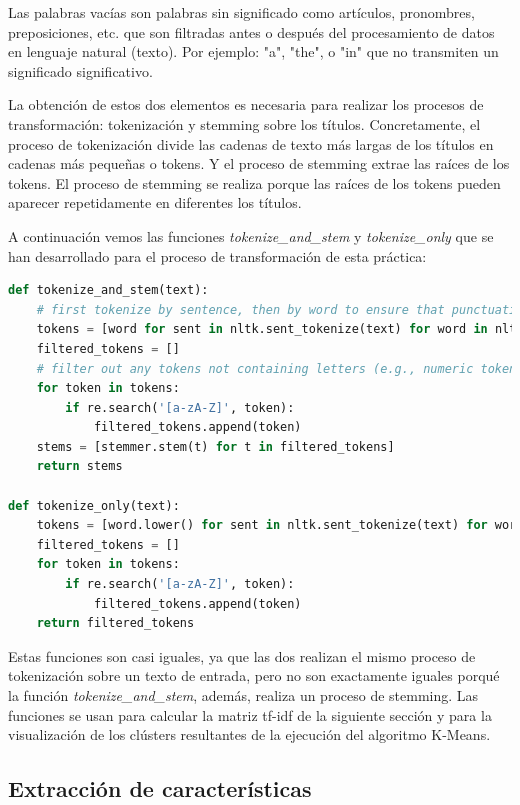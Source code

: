\documentclass{uimppracticas}
\begin{document}
\begin{definition}\label{palabras_vacías}
Las palabras vacías son palabras sin significado como artículos, pronombres, preposiciones, etc. que son filtradas antes o después del procesamiento de datos en lenguaje natural (texto). Por ejemplo: "a", "the", o "in" que no transmiten un significado significativo.
\end{definition}

La obtención de estos dos elementos es necesaria para realizar los procesos de transformación: tokenización y stemming sobre los títulos. Concretamente, el proceso de tokenización divide las cadenas de texto más largas de los títulos en cadenas más pequeñas o tokens. Y el proceso de stemming extrae las raíces de los tokens. El proceso de stemming se realiza porque las raíces de los tokens pueden aparecer repetidamente en diferentes los títulos.

A continuación vemos las funciones \textit{tokenize\_and\_stem} y \textit{tokenize\_only} que se han desarrollado para el proceso de transformación de esta práctica: 

\begin{lstlisting}[language=python]
def tokenize_and_stem(text):
	# first tokenize by sentence, then by word to ensure that punctuation is caught as it's own token
	tokens = [word for sent in nltk.sent_tokenize(text) for word in nltk.word_tokenize(sent)]
	filtered_tokens = []
	# filter out any tokens not containing letters (e.g., numeric tokens, raw punctuation)
	for token in tokens:
		if re.search('[a-zA-Z]', token):
			filtered_tokens.append(token)
	stems = [stemmer.stem(t) for t in filtered_tokens]
	return stems
	
def tokenize_only(text):
	tokens = [word.lower() for sent in nltk.sent_tokenize(text) for word in nltk.word_tokenize(sent)]
	filtered_tokens = []
	for token in tokens:
		if re.search('[a-zA-Z]', token):
			filtered_tokens.append(token)
	return filtered_tokens  
\end{lstlisting}

Estas funciones son casi iguales, ya que las dos realizan el mismo proceso de tokenización sobre un texto de entrada, pero no son exactamente iguales porqué la función \textit{tokenize\_and\_stem}, además, realiza un proceso de stemming. Las funciones se usan para calcular la matriz tf-idf de la siguiente sección y para la visualización de los clústers resultantes de la ejecución del algoritmo K-Means.

\subsection{Extracción de características}
\end{document}
